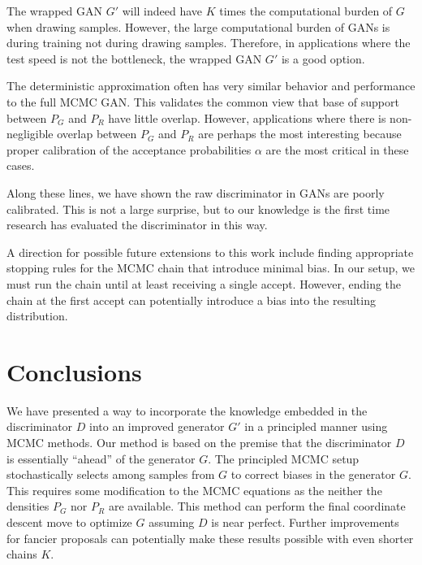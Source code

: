 \documentclass{article}
\begin{document}
The wrapped GAN $G'$ will indeed have $K$ times the computational burden of $G$ when drawing samples.
However, the large computational burden of GANs is during training not during drawing samples.
Therefore, in applications where the test speed is not the bottleneck, the wrapped GAN $G'$ is a good option.

The deterministic approximation often has very similar behavior and performance to the full MCMC GAN\@.
This validates the common view that base of support between $P_G$ and $P_R$ have little overlap.
However, applications where there is non-negligible overlap between $P_G$ and $P_R$ are perhaps the most interesting because proper calibration of the acceptance probabilities $\alpha$ are the most critical in these cases.

Along these lines, we have shown the raw discriminator in GANs are poorly calibrated.
This is not a large surprise, but to our knowledge is the first time research has evaluated the discriminator in this way.

A direction for possible future extensions to this work include finding appropriate stopping rules for the MCMC chain that introduce minimal bias.
In our setup, we must run the chain until at least receiving a single accept.
However, ending the chain at the first accept can potentially introduce a bias into the resulting distribution.

\section{Conclusions}

We have presented a way to incorporate the knowledge embedded in the discriminator $D$ into an improved generator $G'$ in a principled manner using MCMC methods.
Our method is based on the premise that the discriminator $D$ is essentially ``ahead'' of the generator $G$.
The principled MCMC setup stochastically selects among samples from $G$ to correct biases in the generator $G$.
This requires some modification to the MCMC equations as the neither the densities $P_G$ nor $P_R$ are available.
This method can perform the final coordinate descent move to optimize $G$ assuming $D$ is near perfect.
Further improvements for fancier proposals can potentially make these results possible with even shorter chains $K$.
\end{document}
